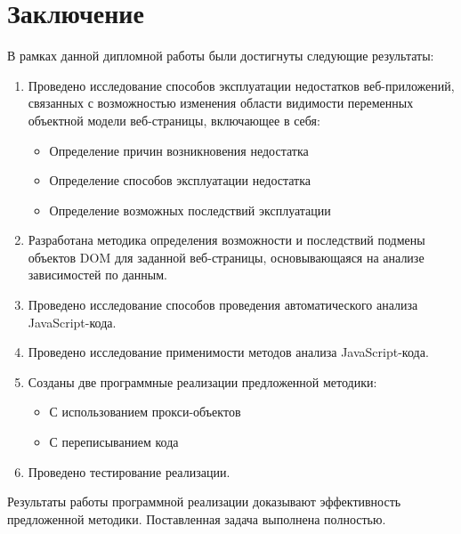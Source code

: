 
\chapter{Заключение}\label{Conclusion}

В рамках данной дипломной работы были достигнуты следующие результаты:

\begin{enumerate}
	\item Проведено исследование способов эксплуатации недостатков веб-приложений, связанных с возможностью изменения области видимости переменных объектной модели веб-страницы, включающее в себя:
		\begin{itemize}
			\item Определение причин возникновения недостатка
			\item Определение способов эксплуатации недостатка
			\item Определение возможных последствий эксплуатации
		\end{itemize}

	\item Разработана методика определения возможности и последствий подмены объектов DOM для заданной веб-страницы, основывающаяся на анализе зависимостей по данным.
	\item Проведено исследование способов проведения автоматического анализа JavaScript-кода.
	\item Проведено исследование применимости методов анализа JavaScript-кода.
	\item Созданы две программные реализации предложенной методики:
		\begin{itemize}
			\item С использованием прокси-объектов
			\item С переписыванием кода
		\end{itemize}
	\item Проведено тестирование реализации.
\end{enumerate}

Результаты работы программной реализации доказывают эффективность предложенной методики. Поставленная задача выполнена полностью.